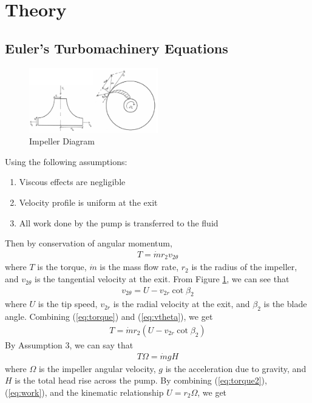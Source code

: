 \section{Theory}
\subsection{Euler's Turbomachinery Equations}
\begin{figure}[h]
    \centering
    \includegraphics[width=0.5\textwidth]{Sections/Figures/theory impeller diagram.png}
    \caption{Impeller Diagram}
    \label{fig:impeller}
\end{figure}
\noindent Using the following assumptions:
\begin{enumerate}
    \item Viscous effects are negligible
    \item Velocity profile is uniform at the exit
    \item All work done by the pump is transferred to the fluid
\end{enumerate}
Then by conservation of angular momentum,
\begin{align}
    T = \dot{m} r_2 v_{2\theta} \label{eq:torque}
\end{align}
where $T$ is the torque, $\dot{m}$ is the mass flow rate, $r_2$ is the radius of the impeller, and $v_{2\theta}$ is the tangential velocity at the exit. From Figure \ref{fig:impeller}, we can see that 
\begin{align}
    v_{2\theta} = U - v_{2r} \cot{\beta_2} \label{eq:vtheta}
\end{align}
where $U$ is the tip speed, $v_{2r}$ is the radial velocity at the exit, and $\beta_2$ is the blade angle. Combining (\ref{eq:torque}) and (\ref{eq:vtheta}), we get
\begin{align}
    T = \dot{m} r_2 (U - v_{2r} \cot{\beta_2}) \label{eq:torque2}
\end{align}
By Assumption 3, we can say that
\begin{align}
    T \Omega = \dot{m} g H \label{eq:work}
\end{align}
where $\Omega$ is the impeller angular velocity, $g$ is the acceleration due to gravity, and $H$ is the total head rise across the pump. By combining (\ref{eq:torque2}), (\ref{eq:work}), and the kinematic relationship $U = r_2 \Omega$, we get
